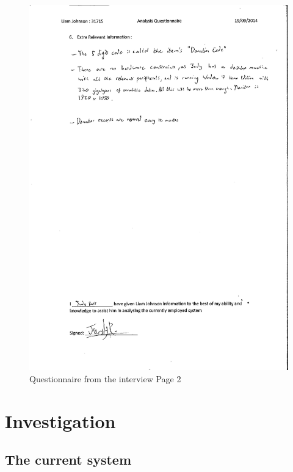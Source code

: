 \begin{figure}[H]
    \includegraphics[width=\textwidth]{Appendix2.pdf}
    \caption{Questionnaire from the interview Page 2} \label{fig:SectionAppendix}
\end{figure}
\section{Investigation}

\subsection{The current system}

